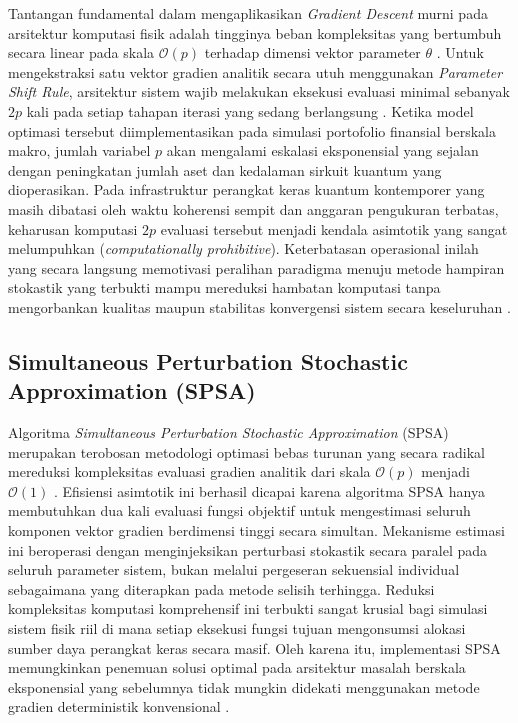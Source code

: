 Tantangan fundamental dalam mengaplikasikan \textit{Gradient Descent} murni pada arsitektur komputasi fisik adalah tingginya beban kompleksitas yang bertumbuh secara linear pada skala $\mathcal{O}(p)$ terhadap dimensi vektor parameter $\theta$ \cite{spall_implementation_1998}. Untuk mengekstraksi satu vektor gradien analitik secara utuh menggunakan \textit{Parameter Shift Rule}, arsitektur sistem wajib melakukan eksekusi evaluasi minimal sebanyak $2p$ kali pada setiap tahapan iterasi yang sedang berlangsung \cite{wierichs_general_2022}. Ketika model optimasi tersebut diimplementasikan pada simulasi portofolio finansial berskala makro, jumlah variabel $p$ akan mengalami eskalasi eksponensial yang sejalan dengan peningkatan jumlah aset dan kedalaman sirkuit kuantum yang dioperasikan. Pada infrastruktur perangkat keras kuantum kontemporer yang masih dibatasi oleh waktu koherensi sempit dan anggaran pengukuran terbatas, keharusan komputasi $2p$ evaluasi tersebut menjadi kendala asimtotik yang sangat melumpuhkan (\textit{computationally prohibitive}). Keterbatasan operasional inilah yang secara langsung memotivasi peralihan paradigma menuju metode hampiran stokastik yang terbukti mampu mereduksi hambatan komputasi tanpa mengorbankan kualitas maupun stabilitas konvergensi sistem secara keseluruhan \cite{spall_implementation_1998}.

\subsection{Simultaneous Perturbation Stochastic Approximation (SPSA)}
Algoritma \textit{Simultaneous Perturbation Stochastic Approximation} (SPSA) merupakan terobosan metodologi optimasi bebas turunan yang secara radikal mereduksi kompleksitas evaluasi gradien analitik dari skala $\mathcal{O}(p)$ menjadi $\mathcal{O}(1)$ \cite{spall_implementation_1998}. Efisiensi asimtotik ini berhasil dicapai karena algoritma SPSA hanya membutuhkan dua kali evaluasi fungsi objektif untuk mengestimasi seluruh komponen vektor gradien berdimensi tinggi secara simultan. Mekanisme estimasi ini beroperasi dengan menginjeksikan perturbasi stokastik secara paralel pada seluruh parameter sistem, bukan melalui pergeseran sekuensial individual sebagaimana yang diterapkan pada metode selisih terhingga. Reduksi kompleksitas komputasi komprehensif ini terbukti sangat krusial bagi simulasi sistem fisik riil di mana setiap eksekusi fungsi tujuan mengonsumsi alokasi sumber daya perangkat keras secara masif. Oleh karena itu, implementasi SPSA memungkinkan penemuan solusi optimal pada arsitektur masalah berskala eksponensial yang sebelumnya tidak mungkin didekati menggunakan metode gradien deterministik konvensional \cite{wang_variational_2025}.

